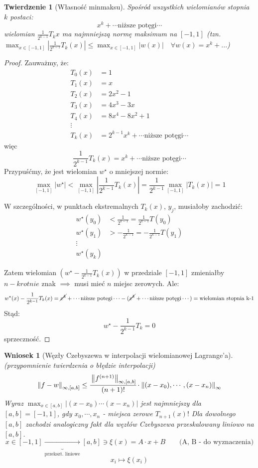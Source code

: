 \documentclass[hidelinks,a4paper,fleqn,oneside]{book}
\newcommand{\ra}{\rightarrow}
\newcommand{\norm}[1]{\left\lVert#1\right\rVert}
\newtheorem{wniosek}{Wniosek}
\newtheorem{twierdz}{Twierdzenie}
\begin{document}
\begin{twierdz}[Własność minmaksu]
Spośród wszystkich wielomianów stopnia $k$ postaci:
\[
	x^k + \cdots\textrm{niższe potęgi}\cdots
\]
wielomian $\frac{1}{2^{k-1}}T_k{x}$ ma najmniejszą normę maksimum na $[-1, 1]$ (tzn. $\max_{x\in[-1, 1]} |\frac{1}{2^{k-1}}T_k(x)| \leq \max_{x \in [-1, 1]}|w(x)| \quad \forall w(x) = x^k + ...$)

\end{twierdz}

\begin{proof}
Zauważmy, że:
\[
\begin{array}{rl}
	T_0(x) & = 1 \\
	T_1(x) & = x \\
	T_2(x) & = 2x^2 - 1 \\
	T_3(x) & = 4x^3 - 3x \\
	T_4(x) & = 8x^4 - 8x^2 + 1 \\
	\vdots \\
	T_k(x) & = 2^{k-1}x^k + \cdots \textrm{niższe potęgi} \cdots
\end{array}
\]
więc
\[
	\frac{1}{2^{k-1}}T_k(x) = x^k + \cdots \textrm{niższe potęgi} \cdots
\]
Przypuśćmy, że jest wielomian $w^\star$ o mniejszej normie:
\[
	\max_{[-1, 1]}|w^\star| < \max_{[-1, 1]}|\frac{1}{2^{k-1}}T_k(x)| = \frac{1}{2^{k-1}} \max_{[-1, 1]} |T_k(x)| = 1
\]

W szczególności, w punktach ekstremalnych $T_k(x)$, $y_j$, musiałoby zachodzić:
\[
	\begin{array}{rl}
	w^\star(y_0) & < \frac{1}{2^{k-1}}  = \frac{1}{2^{k-1}} T(y_0)\\
	w^\star(y_1) & > -\frac{1}{2^{k-1}} = -\frac{1}{2^{k-1}} T(y_1) \\
	\vdots \\
	w^\star(y_k)
	\end{array}
\]

Zatem wielomian $(w^\star - \frac{1}{2^{k-1}}T_k(x))$ w przedziale $[-1, 1]$ zmieniałby $n-krotnie$ znak $\implies$ musi mieć $n$ miejsc zerowych. Ale:
\[
	w^\star(x)  - \frac{1}{2^{k-1}}T_k(x) = \cancel{x^k} + \cdots \textrm{niższe potegi}\cdots - (\cancel{x^k} + \cdots \textrm{niższe potęgi}\cdots) = \textrm{wielomian stopnia k-1}
\]
Stąd:
\[
	w^\star - \frac{1}{2^{k-1}}T_k = 0
\]
sprzeczność.
\end{proof}

\begin{wniosek}[Węzły Czebyszewa w interpolacji wielomianowej Lagrange'a]
(przypomnienie twierdzenia o błędzie interpolacji)
\[
	\norm{f-w}_{\infty, [a, b]} \leq \cfrac{\norm{f^{(n+1)}}_{\infty, [a,b]}}{(n+1)!} \cdot \norm{(x-x_0), \cdots, (x-x_n)}_\infty
\]
Wyraz $\max_{x \in [a, b]}|(x-x_0)\cdots(x-x_n)|$ jest najmniejszy dla $[a, b] = [-1, 1]$, gdy $x_0, \cdots, x_n$ - miejsca zerowe $T_{n+1}(x)!$ Dla dowolnego $[a, b]$ zachodzi analogiczny fakt dla węzłów Czebyszewa przeskalowany liniowo na $[a,b]$.
\[
	x \in [-1, 1] \underbrace{\ra}_{\textrm{przekszt. liniowe}} [a, b] \ni \xi(x) = A\cdot x + B \quad\quad\textrm{(A, B - do wyznaczenia)}
\]
\[
	x_i \mapsto \xi(x_i)
\]
\end{wniosek}
\end{document}
